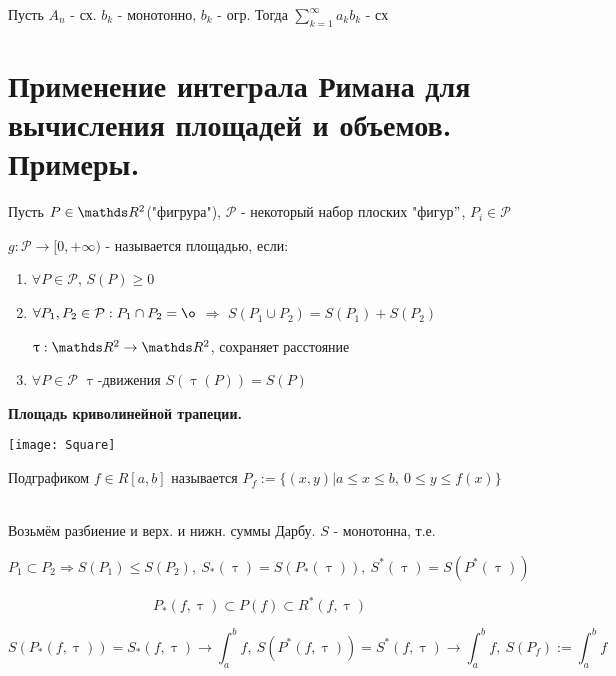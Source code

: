 \documentclass[11pt, fleqn]{article}
\begin{document}
\begin{Property}[3]
\begin{Property}[4]
\begin{Property}[2, аддитивность]
\begin{Proof}
\begin{theorem} 
    Пусть $A_n$ - сх. $b_k$ - монотонно, $b_k$ - огр. Тогда $\sum\limits_{k=1}^\infty a_k b_k$ - сх
\end{theorem}

\newpage
\section{Применение интеграла Римана для вычисления площадей и объемов. Примеры.}

\begin{definition} [школьное]
    Пусть $P \in \R^2$("фигрура"), $\mathcal{P}$ - некоторый набор плоских "фигур$"$, $P_i \in \mathcal{P}$
    
    $g: \mathcal{P} \rightarrow [0, +\infty)$ - называется площадью, если: 
    \begin{enumerate}
        \item $\forall P \in \mathcal{P}$, $S(P) \geqslant 0$
        \item $\forall P_1, P_2 \in \mathcal{P}: P_1 \cap P_2 = \o$ $\Rightarrow$ $S(P_1 \cup P_2)=S(P_1)+S(P_2)$
        \begin{definition}
            $\uptau: \R^2 \rightarrow \R^2$, сохраняет расстояние
        \end{definition}
        \item $\forall P \in \mathcal{P}$ $\uptau$-движения $S(\uptau(P))=S(P)$
    \end{enumerate}
\end{definition}

\begin{center}
    \textbf{Площадь криволинейной трапеции.}
\end{center}

\texttt{[image: Square]}

\begin{definition}
    Подграфиком $f \in R[a,b]$ называется $P_f := \{(x,y)| a \leqslant x \leqslant b,\ 0 \leqslant y \leqslant f(x) \}$
\end{definition}
\\
Возьмём разбиение и верх. и нижн. суммы Дарбу. $S$ - монотонна, т.е. 

$$P_1 \subset P_2 \Rightarrow S(P_1) \leqslant S(P_2),\ S_*(\uptau)=S(P_*(\uptau)),\ S^*(\uptau)=S(P^*(\uptau))$$ 

$$P_*(f, \uptau) \subset P (f) \subset R^* (f, \uptau)$$

$$S(P_*(f, \uptau)) = S_*(f, \uptau) \rightarrow \int_a^b f,\ S(P^*(f, \uptau)) = S^*(f, \uptau) \rightarrow \int_a^b f,\ S(P_f) := \int_a^b f$$


\end{Proof}
\end{Property}
\end{Property}
\end{Property}
\end{document}
